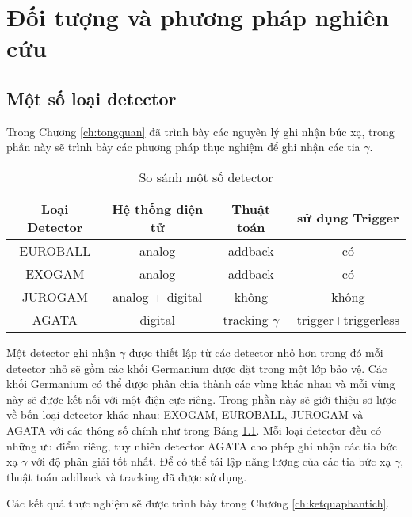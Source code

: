 \chapter{Đối tượng và phương pháp nghiên cứu}
\label{ch:doituongnghiencuu}

\section{Một số loại detector}

Trong Chương \ref{ch:tongquan} đã trình bày các nguyên lý ghi nhận bức xạ, trong phần này sẽ trình bày các phương pháp thực nghiệm để ghi nhận các tia $\gamma$.%

\begin{table}[!h]%
\caption{So sánh một số detector}
\centering
\begin{tabular}{|c|c|c|c|}
\hline 
Loại Detector & Hệ thống điện tử & Thuật toán & sử dụng Trigger \\ 
\hline 
EUROBALL & analog & addback & có \\ 
\hline 
EXOGAM & analog & addback & có \\ 
\hline 
JUROGAM & analog + digital & không & không \\ 
\hline 
AGATA & digital & tracking $\gamma$ & trigger+triggerless \\ 
\hline 
\end{tabular} 
\label{table:detector}%
\end{table}%

Một detector ghi nhận $\gamma$ được thiết lập từ các detector nhỏ hơn trong đó mỗi detector nhỏ sẽ gồm các khối Germanium  được đặt trong một lớp bảo vệ. Các khối Germanium có thể được phân chia thành các vùng khác nhau  và mỗi vùng này sẽ được kết nối với một điện cực riêng. Trong phần này sẽ giới thiệu sơ lược về bốn loại detector khác nhau: EXOGAM, EUROBALL, JUROGAM và AGATA \cite{bib_Bazzaco, bib_Simpson}  với các thông số chính như trong Bảng \ref{table:detector}. Mỗi loại detector đều có những ưu điểm riêng, tuy nhiên detector AGATA cho phép ghi nhận các tia bức xạ  $\gamma$ với độ phân giải tốt nhất. Để có thể tái lập năng lượng của các tia bức xạ $\gamma$, thuật toán addback và tracking đã được sử dụng.%

Các kết quả thực nghiệm sẽ được trình bày trong Chương \ref{ch:ketquaphantich}.%